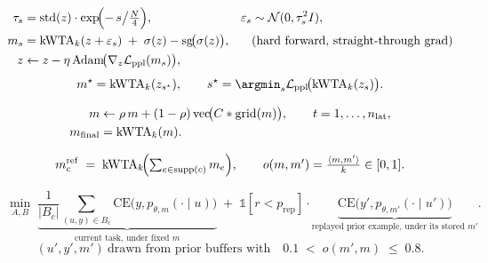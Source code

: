 \begin{align}
  \tau_s      &= \operatorname{std}(z)\cdot \exp\!\Bigl(-\,s \big/ \tfrac{N}{4}\Bigr),
                 &\varepsilon_s &\sim \mathcal{N}(0,\tau_s^2 I), \\
  m_s         &= \mathrm{kWTA}_k(z + \varepsilon_s) \;+\; \sigma(z) - \mathrm{sg}\!\bigl(\sigma(z)\bigr),
                 &&\text{(hard forward, straight-through grad)}\\
  z           &\leftarrow z - \eta\,\mathrm{Adam}\!\bigl(\nabla_z \mathcal{L}_{\mathrm{ppl}}(m_s)\bigr),
\end{align}
\begin{equation}
  m^\star = \kwta(z_{s^\star}), \qquad
  s^\star = \argmin_{s} \mathcal{L}_{\mathrm{ppl}}\!\bigl(\kwta(z_s)\bigr).
\end{equation}

\begin{align}
  m &\leftarrow \rho\, m + (1-\rho)\,\mathrm{vec}\!\bigl(C * \mathrm{grid}(m)\bigr),
     \qquad t = 1,\dots,n_{\mathrm{lat}}, \\
  m_{\mathrm{final}} &= \mathrm{kWTA}_k(m).
\end{align}

\begin{equation}
  m^{\mathrm{ref}}_c \;=\; \mathrm{kWTA}_k\!\Bigl( \textstyle\sum_{e \in \mathrm{supp}(c)} m_e \Bigr),
  \qquad
  o(m, m') = \frac{\langle m, m'\rangle}{k} \in [0,1].
\end{equation}

\begin{equation}
  \min_{A,B}\;
  \underbrace{\frac{1}{|B_c|}\sum_{(u,y)\in B_c} \mathrm{CE}\bigl(y, p_{\theta,m}(\cdot\mid u)\bigr)}_{\text{current task, under fixed }m}
  \;+\;
  \mathbb{1}[r<p_{\mathrm{rep}}]\cdot
  \underbrace{\mathrm{CE}\bigl(y', p_{\theta,m'}(\cdot\mid u')\bigr)}_{\text{replayed prior example, under its stored }m'} .
\end{equation}
\begin{equation}
  (u', y', m')\ \text{drawn from prior buffers with}\quad
  0.1 \;<\; o(m', m) \;\le\; 0.8 .
\end{equation}
